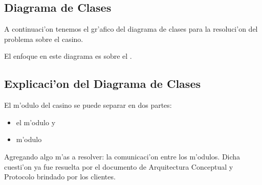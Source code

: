 \subsection{Diagrama de Clases}

A continuaci'on tenemos el gr'afico del diagrama de clases para la resoluci'on del problema sobre el casino.

El enfoque en este diagrama es sobre el .

\clearpage

\subsection{Explicaci'on del Diagrama de Clases}

El m'odulo del casino se puede separar en dos partes: 

\begin{itemize}
\item el m'odulo  y
\item m'odulo 
\end{itemize}  

Agregando algo m'as a resolver: la comunicaci'on entre los m'odulos. Dicha cuesti'on ya fue resuelta por el documento de Arquitectura Conceptual y Protocolo brindado por los clientes.
